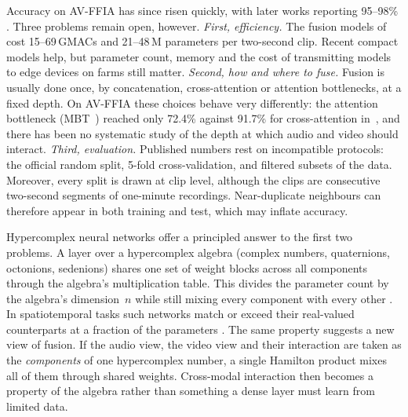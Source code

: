Accuracy on AV-FFIA has since risen quickly, with later works reporting 95--98\%
\cite{acafnet2025,dynagate2026,hmmfnet2026,hmkd2026,ldmf2026}. Three problems remain open, however.
\emph{First, efficiency.} The fusion models of~\cite{cui2024uffia} cost 15--69\,GMACs and 21--48\,M
parameters per two-second clip. Recent compact models help, but parameter count, memory and the
cost of transmitting models to edge devices on farms still matter.
\emph{Second, how and where to fuse.} Fusion is usually done once, by concatenation, cross-attention
or attention bottlenecks, at a fixed depth. On AV-FFIA these choices behave very differently: the
attention bottleneck (MBT~\cite{nagrani2021mbt}) reached only 72.4\% against 91.7\% for cross-attention
in~\cite{cui2024uffia}, and there has been no systematic study of the depth at which audio and video
should interact.
\emph{Third, evaluation.} Published numbers rest on incompatible protocols: the official random split,
5-fold cross-validation, and filtered subsets of the data. Moreover, every split is drawn at clip level,
although the clips are consecutive two-second segments of one-minute recordings. Near-duplicate
neighbours can therefore appear in both training and test, which may inflate accuracy.

Hypercomplex neural networks offer a principled answer to the first two problems.
A layer over a hypercomplex algebra (complex numbers, quaternions, octonions, sedenions) shares one set
of weight blocks across all components through the algebra's multiplication table. This divides the
parameter count by the algebra's dimension~$n$ while still mixing every component with every other
\cite{parcollet2019qrnn,zhang2021phm,grassucci2022phnn}. In spatiotemporal tasks such networks match
or exceed their real-valued counterparts at a fraction of the parameters
\cite{bojesomo2024hypercomplex,bojesomo2023octonion,bojesomo2020sedenion}. The same property suggests a
new view of fusion. If the audio view, the video view and their interaction are taken as the
\emph{components} of one hypercomplex number, a single Hamilton product mixes all of them through
shared weights. Cross-modal interaction then becomes a property of the algebra rather than something
a dense layer must learn from limited data.

